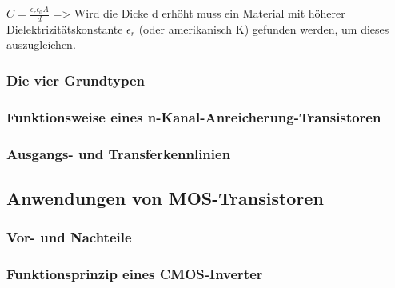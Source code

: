 		$C = \frac{\epsilon_r  \epsilon_0 A}{d}$ => Wird die Dicke d erhöht muss ein Material mit höherer Dielektrizitätskonstante $\epsilon_r$ (oder amerikanisch K) gefunden werden, um dieses auszugleichen.
	\subsubsection{Die vier Grundtypen}
	\subsubsection{Funktionsweise eines n-Kanal-Anreicherung-Transistoren}
	\subsubsection{Ausgangs- und Transferkennlinien}
\subsection{Anwendungen von MOS-Transistoren}
	
	\subsubsection{Vor- und Nachteile}
	\subsubsection{Funktionsprinzip eines CMOS-Inverter}


